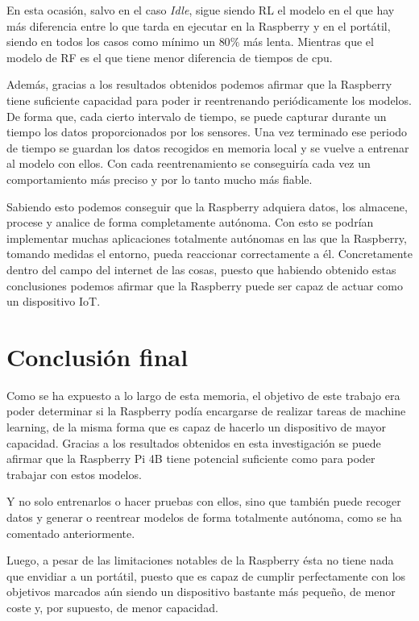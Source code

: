 \documentclass[a4paper, 12pt]{book}
\begin{document}
En esta ocasión, salvo en el caso \textit{Idle}, sigue siendo RL el modelo en el que hay más diferencia entre lo que tarda en ejecutar en la Raspberry y en el portátil, siendo en todos los casos como mínimo un $80\%$ más lenta. Mientras que el modelo de RF es el que tiene menor diferencia de tiempos de cpu.

Además, gracias a los resultados obtenidos podemos afirmar que la Raspberry tiene suficiente capacidad para poder ir reentrenando periódicamente los modelos. De forma que, cada cierto intervalo de tiempo, se puede capturar durante un tiempo los datos proporcionados por los sensores. Una vez terminado ese periodo de tiempo se guardan los datos recogidos en memoria local y se vuelve a entrenar al modelo con ellos. Con cada reentrenamiento se conseguiría cada vez un comportamiento más preciso y por lo tanto mucho más fiable.

Sabiendo esto podemos conseguir que la Raspberry adquiera datos, los almacene, procese y analice de forma completamente autónoma. Con esto se podrían implementar muchas aplicaciones totalmente autónomas en las que la Raspberry, tomando medidas el entorno, pueda reaccionar correctamente a él. Concretamente dentro del campo del internet de las cosas, puesto que habiendo obtenido estas conclusiones podemos afirmar que la Raspberry puede ser capaz de actuar como un dispositivo IoT.


\section{Conclusión final}
\label{sec:conclusion_final}

Como se ha expuesto a lo largo de esta memoria, el objetivo de este trabajo era poder determinar si la Raspberry podía encargarse de realizar tareas de machine learning, de la misma forma que es capaz de hacerlo un dispositivo de mayor capacidad. Gracias a los resultados obtenidos en esta investigación se puede afirmar que la Raspberry Pi 4B tiene potencial suficiente como para poder trabajar con estos modelos.

Y no solo entrenarlos o hacer pruebas con ellos, sino que también puede recoger datos y generar o reentrear modelos de forma totalmente autónoma, como se ha comentado anteriormente. 

Luego, a pesar de las limitaciones notables de la Raspberry ésta no tiene nada que envidiar a un portátil, puesto que es capaz de cumplir perfectamente con los objetivos marcados aún siendo un dispositivo bastante más pequeño, de menor coste y, por supuesto, de menor capacidad.
\end{document}
